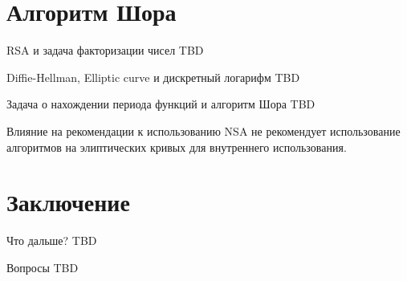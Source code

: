 \documentclass[10pt,pdf,hyperref={unicode}]{beamer}
\begin{document}
\section{Алгоритм Шора}
\begin{frame}{RSA и задача факторизации чисел}
TBD
\end{frame}

\begin{frame}{Diffie-Hellman, Elliptic
curve и дискретный логарифм}
TBD
\end{frame}

\begin{frame}{Задача о нахождении периода функций и алгоритм Шора}
TBD
\end{frame}

\begin{frame}{Влияние на рекомендации к использованию}
NSA не рекомендует использование алгоритмов на элиптических кривых для
внутреннего использования.
\end{frame}

\section{Заключение}
\begin{frame}{Что дальше?}
TBD
\end{frame}

\begin{frame}{Вопросы}
TBD
\end{frame}
\end{document}
